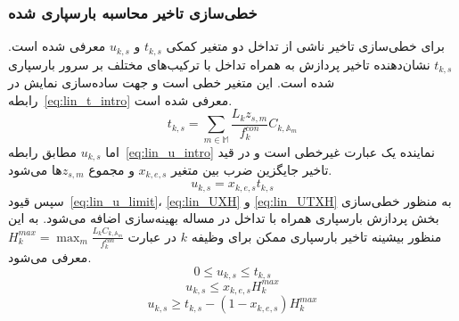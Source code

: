 \subsubsection{خطی‌سازی تاخیر محاسبه بارسپاری شده}
برای خطی‌سازی تاخیر ناشی از تداخل دو متغیر کمکی $t_{k,s}$ و $u_{k,s}$ معرفی شده است. $t_{k,s}$ نشان‌دهنده تاخیر پردازش به همراه تداخل با ترکیب‌های مختلف بر سرور بارسپاری شده است. این متغیر خطی است و جهت ساده‌سازی نمایش در رابطه~\eqref{eq:lin_t_intro} معرفی شده است.
\begin{equation} \label{eq:lin_t_intro}
    t_{k,s} = \sum_{m \in \mathbb{M}}\frac{L_k z_{s,m}}{f^{con}_k} C_{k,\mathbb{A}_m}
\end{equation}
اما $u_{k,s}$ مطابق رابطه~\eqref{eq:lin_u_intro} نماینده یک عبارت غیرخطی است و در قید تاخیر جایگزین ضرب بین متغیر $x_{k,e,s}$ و مجموع $z_{s,m}$ها می‌شود.
\begin{equation} \label{eq:lin_u_intro}
    u_{k,s} = x_{k,e,s} t_{k,s}
\end{equation}
سپس قیود~\eqref{eq:lin_u_limit}، \eqref{eq:lin_UXH} و \eqref{eq:lin_UTXH} به منظور خطی‌سازی بخش پردازش بارسپاری همراه با تداخل در مساله بهینه‌سازی اضافه می‌شود. به این منظور بیشینه تاخیر بارسپاری ممکن برای وظیفه $k$ در عبارت $H^{max}_k = \max_m \frac{L_k C_{k,\mathbb{A}_m}}{f^{con}_k}$ معرفی می‌شود.
\begin{equation} \label{eq:lin_u_limit}
    0 \leq u_{k,s} \leq t_{k,s}
\end{equation}
\begin{equation} \label{eq:lin_UXH}
    u_{k,s} \leq x_{k,e,s} H^{max}_k
\end{equation}
\begin{equation} \label{eq:lin_UTXH}
    u_{k,s} \geq t_{k,s} - (1-x_{k,e,s}) H^{max}_k
\end{equation}

